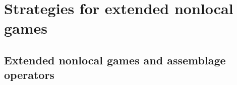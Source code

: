 \section{Strategies for extended nonlocal games} \label{sec:strategies-extended-nonlocal-games}

\subsection{Extended nonlocal games and assemblage operators} \label{sec:extended-nonlocal-games-and-assemblage-operators}


